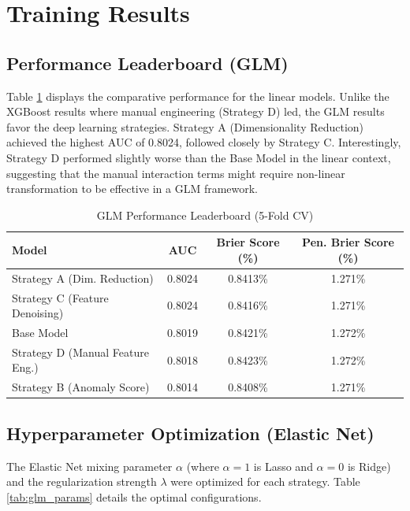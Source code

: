\documentclass{report}\usepackage[]{graphicx}\usepackage[]{xcolor}
\begin{document}
\section{Training Results}

\subsection{Performance Leaderboard (GLM)}

Table \ref{tab:glm_leaderboard} displays the comparative performance for the linear models. Unlike the XGBoost results where manual engineering (Strategy D) led, the GLM results favor the deep learning strategies. Strategy A (Dimensionality Reduction) achieved the highest AUC of 0.8024, followed closely by Strategy C. Interestingly, Strategy D performed slightly worse than the Base Model in the linear context, suggesting that the manual interaction terms might require non-linear transformation to be effective in a GLM framework.

\begin{table}[h]
    \centering
    \caption{GLM Performance Leaderboard (5-Fold CV)}
    \label{tab:glm_leaderboard}
    \begin{tabular}{lccc}
        \hline
        \textbf{Model} & \textbf{AUC} & \textbf{Brier Score (\%)} & \textbf{Pen. Brier Score (\%)} \\
        \hline
        Strategy A (Dim. Reduction) & 0.8024 & 0.8413\% & 1.271\% \\
        Strategy C (Feature Denoising) & 0.8024 & 0.8416\% & 1.271\% \\
        Base Model & 0.8019 & 0.8421\% & 1.272\% \\
        Strategy D (Manual Feature Eng.) & 0.8018 & 0.8423\% & 1.272\% \\
        Strategy B (Anomaly Score) & 0.8014 & 0.8408\% & 1.271\% \\
        \hline
    \end{tabular}
\end{table}

\subsection{Hyperparameter Optimization (Elastic Net)}

The Elastic Net mixing parameter $\alpha$ (where $\alpha=1$ is Lasso and $\alpha=0$ is Ridge) and the regularization strength $\lambda$ were optimized for each strategy. Table \ref{tab:glm_params} details the optimal configurations.
\end{document}
